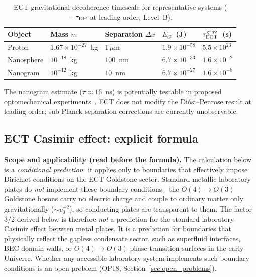 \documentclass[11pt,a4paper]{article}
\numberwithin{equation}{section}
\begin{document}
\begin{table}[h!]
\centering
\renewcommand{\arraystretch}{1.3}
\caption{ECT gravitational decoherence timescale for representative
systems ($= \tau_{\rm DP}$ at leading order, Level~B).}
\label{tab:diosi_penrose}
\begin{tabular}{@{}lllll@{}}
\hline
Object & Mass $m$ & Separation $\Delta x$ & $E_G$~(J) & $\tau_{\rm ECT}^{\rm grav}$~(s) \\
\hline
Proton & $1.67\times10^{-27}$~kg & $1\,\mu$m
  & $1.9\times10^{-58}$ & $5.5\times10^{23}$ \\
Nanosphere & $10^{-18}$~kg & $100$~nm
  & $6.7\times10^{-33}$ & $1.6\times10^{-2}$ \\
Nanogram & $10^{-12}$~kg & $10$~nm
  & $6.7\times10^{-27}$ & $1.6\times10^{-8}$ \\
\hline
\end{tabular}
\end{table}

The nanogram estimate ($\tau\approx 16$~ns) is potentially testable
in proposed optomechanical experiments~\cite{Marshall2003}.
ECT does not modify the Di\'osi--Penrose result at leading order;
sub-Planck-separation corrections are currently unobservable.


\subsection{ECT Casimir effect: explicit formula}



\textbf{Scope and applicability (read before the formula).}
The calculation below is a \emph{conditional prediction}: it applies
only to boundaries that effectively impose Dirichlet conditions on
the ECT Goldstone sector.  Standard metallic laboratory plates do
\emph{not} implement these boundary conditions---the $O(4)\to O(3)$
Goldstone bosons carry no electric charge and couple to ordinary
matter only gravitationally ($\sim v_0^{-2}$), so conducting plates
are transparent to them.  The factor $3/2$ derived below is therefore
\emph{not} a prediction for the standard laboratory Casimir effect
between metal plates.  It is a prediction for boundaries that
physically reflect the gapless condensate sector, such as
superfluid interfaces, BEC domain walls, or $O(4)\to O(3)$
phase-transition surfaces in the early Universe.  Whether any
accessible laboratory system implements such boundary conditions is
an open problem (OP18, Section~\ref{sec:open_problems}).
\end{document}
